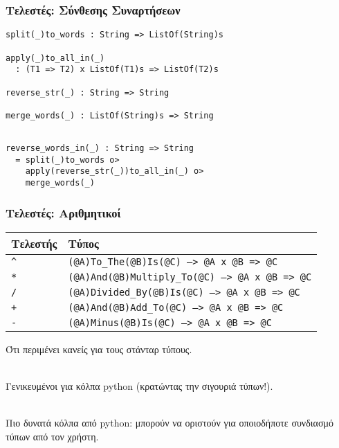 \documentclass{beamer}
\def\e{\foreignlanguage{english}}
\begin{document}
\begin{frame}[fragile]

\frametitle{Τελεστές: Σύνθεσης Συναρτήσεων}

\begin{otherlanguage}{english}
\begin{verbatim}
split(_)to_words : String => ListOf(String)s

apply(_)to_all_in(_)
  : (T1 => T2) x ListOf(T1)s => ListOf(T2)s

reverse_str(_) : String => String

merge_words(_) : ListOf(String)s => String
\end{verbatim}
\pause
\begin{verbatim}

reverse_words_in(_) : String => String
  = split(_)to_words o>
    apply(reverse_str(_))to_all_in(_) o>
    merge_words(_)
\end{verbatim}
\end{otherlanguage}

\end{frame}

\begin{frame}

\frametitle{Τελεστές: Αριθμητικοί}

\begin{center}
\begin{tabular}{ |P{1.5cm}|P{8.9cm}| }
 \hline
 Τελεστής & Τύπος
 \\
 \hline
 \e{\texttt{\^}} & \e{\texttt{(@A)To\_The(@B)Is(@C) --> @A x @B => @C}}
 \\
 \e{\texttt{*}} & \e{\texttt{(@A)And(@B)Multiply\_To(@C) --> @A x @B => @C}}
 \\
 \e{\texttt{/}} & \e{\texttt{(@A)Divided\_By(@B)Is(@C) --> @A x @B => @C}}
 \\
 \e{\texttt{+}} & \e{\texttt{(@A)And(@B)Add\_To(@C) --> @A x @B => @C}}
 \\
 \e{\texttt{-}} & \e{\texttt{(@A)Minus(@B)Is(@C) --> @A x @B => @C}}
 \\
 \hline
\end{tabular}
\end{center}

\pause
Ότι περιμένει κανείς για τους στάνταρ τύπους.
\\~\

Γενικευμένοι για κόλπα \e{python} (κρατώντας την σιγουριά τύπων!).
\\~\

Πιο δυνατά κόλπα από \e{python}: μπορούν να οριστούν για οποιοδήποτε
συνδιασμό τύπων από τον χρήστη.

\end{frame}
\end{document}
